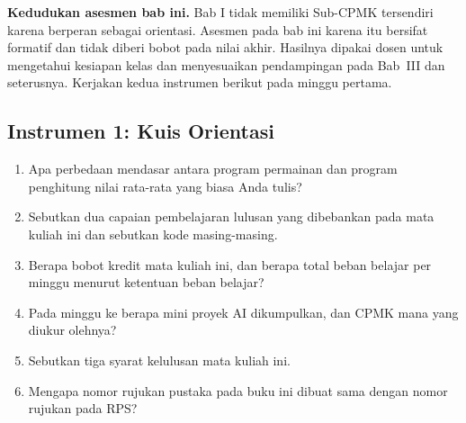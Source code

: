 
\begin{asesmenbox}
\textbf{Kedudukan asesmen bab ini.} Bab I tidak memiliki Sub-CPMK tersendiri
karena berperan sebagai orientasi. Asesmen pada bab ini karena itu bersifat
formatif dan tidak diberi bobot pada nilai akhir. Hasilnya dipakai dosen
untuk mengetahui kesiapan kelas dan menyesuaikan pendampingan pada Bab~III dan
seterusnya. Kerjakan kedua instrumen berikut pada minggu pertama.
\end{asesmenbox}

\subsection*{Instrumen 1: Kuis Orientasi}

\begin{enumerate}
  \item Apa perbedaan mendasar antara program permainan dan program
        penghitung nilai rata-rata yang biasa Anda tulis?
  \item Sebutkan dua capaian pembelajaran lulusan yang dibebankan pada mata
        kuliah ini dan sebutkan kode masing-masing.
  \item Berapa bobot kredit mata kuliah ini, dan berapa total beban belajar
        per minggu menurut ketentuan beban belajar?
  \item Pada minggu ke berapa mini proyek AI dikumpulkan, dan CPMK mana yang
        diukur olehnya?
  \item Sebutkan tiga syarat kelulusan mata kuliah ini.
  \item Mengapa nomor rujukan pustaka pada buku ini dibuat sama dengan nomor
        rujukan pada RPS?
\end{enumerate}

